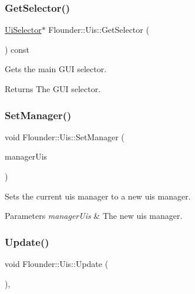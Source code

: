 \subsubsection{\texorpdfstring{Get\+Selector()}{GetSelector()}}
{\footnotesize\ttfamily \hyperlink{class_flounder_1_1_ui_selector}{Ui\+Selector}$\ast$ Flounder\+::\+Uis\+::\+Get\+Selector (\begin{DoxyParamCaption}{ }\end{DoxyParamCaption}) const\hspace{0.3cm}{\ttfamily [inline]}}



Gets the main G\+UI selector. 

\begin{DoxyReturn}{Returns}
The G\+UI selector. 
\end{DoxyReturn}
\mbox{\label{class_flounder_1_1_uis_a300312224eb6409b14c3e7f7d72d7b65}} 
\subsubsection{\texorpdfstring{Set\+Manager()}{SetManager()}}
{\footnotesize\ttfamily void Flounder\+::\+Uis\+::\+Set\+Manager (\begin{DoxyParamCaption}\item[{\hyperlink{class_flounder_1_1_i_manager_uis}{I\+Manager\+Uis} $\ast$}]{manager\+Uis }\end{DoxyParamCaption})\hspace{0.3cm}{\ttfamily [inline]}}



Sets the current uis manager to a new uis manager. 


\begin{DoxyParams}{Parameters}
{\em manager\+Uis} & The new uis manager. \\
\hline
\end{DoxyParams}
\mbox{\label{class_flounder_1_1_uis_a373eafdf7d64c6250294b01567124046}} 
\subsubsection{\texorpdfstring{Update()}{Update()}}
{\footnotesize\ttfamily void Flounder\+::\+Uis\+::\+Update (\begin{DoxyParamCaption}{ }\end{DoxyParamCaption})\hspace{0.3cm}{\ttfamily [override]}, {\ttfamily [virtual]}}




